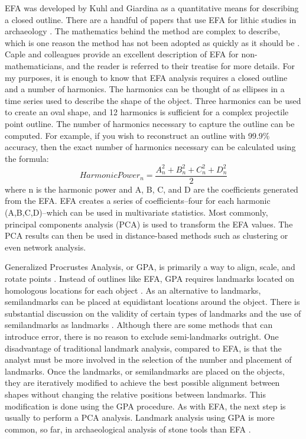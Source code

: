 \documentclass[a4paper]{article}
\begin{document}
EFA was developed by Kuhl and Giardina \autocite*{Kuhl1982-kd} as a quantitative means for describing a closed outline. There are a handful of papers that use EFA for lithic studies in archaeology \autocites[e.g.,][]{Cardillo2010-ys,Fox2015-ox,Gingerich2014-cb,Hoggard2019-yw,Iovita2011-nz,Iovita2011-zp}. The mathematics behind the method are complex to describe, which is one reason the method has not been adopted as quickly as it should be \autocite[see][]{Caple2017-mk}. Caple and colleagues \autocite{Caple2017-mk} provide an excellent description of EFA for non-mathematicians, and the reader is referred to their treatise for more details. For my purposes, it is enough to know that EFA analysis requires a closed outline and a number of harmonics. The harmonics can be thought of as ellipses in a time series used to describe the shape of the object. Three harmonics can be used to create an oval shape, and 12 harmonics is sufficient for a complex projectile point outline. The number of harmonics necessary to capture the outline can be computed. For example, if you wish to reconstruct an outline with 99.9\% accuracy, then the exact number of harmonics necessary can be calculated using the formula: \[ HarmonicPower_n = \frac{A^2_n+B^2_n+C^2_n+D^2_n}{2} \] where n is the harmonic power and A, B, C, and D are the coefficients generated from the EFA. EFA creates a series of coefficients--four for each harmonic (A,B,C,D)--which can be used in multivariate statistics. Most commonly, principal components analysis (PCA) is used to transform the EFA values. The PCA results can then be used in distance-based methods such as clustering or even network analysis.

Generalized Procrustes Analysis, or GPA, is primarily a way to align, scale, and rotate points \autocite{Gower1975-uv}. Instead of outlines like EFA, GPA requires landmarks located on homologous locations for each object \autocite{Rohlf1990-mp}. As an alternative to landmarks, semilandmarks can be placed at equidistant locations around the object. There is substantial discussion on the validity of certain types of landmarks and the use of semilandmarks as landmarks \autocites[e.g.,][]{De_Groote2011-mh,MacLeod2017-yl,Okumura2019-ur,Shott2010-fn}. Although there are some methods that can introduce error, there is no reason to exclude semi-landmarks outright. One disadvantage of traditional landmark analysis, compared to EFA, is that the analyst must be more involved in the selection of the number and placement of landmarks. Once the landmarks, or semilandmarks are placed on the objects, they are iteratively modified to achieve the best possible alignment between shapes without changing the relative positions between landmarks. This modification is done using the GPA procedure. As with EFA, the next step is usually to perform a PCA analysis. Landmark analysis using GPA is more common, so far, in archaeological analysis of stone tools than EFA \autocites[e.g.,][]{Archer2018-zi,Bischoff2020-zn,Buchanan2015-dx,Charlin2018-yg,Fisher2018-jq,Gingerich2014-cb,Herzlinger2017-ce,Lycett2010-od,Riede2019-gb,Selden2020-ni,Shott2010-fn,Smith2015-qk,Thulman2012-fo}.
\end{document}
